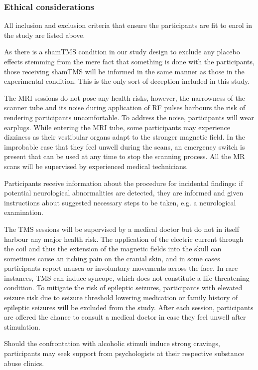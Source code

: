 \documentclass[12pt]{article}
\begin{document}
\subsubsection{Ethical considerations}
All inclusion and exclusion criteria that ensure the participants are fit to enrol in the study are listed above.

As there is a shamTMS condition in our study design to exclude any placebo effects stemming from the mere fact that something is done with the participants, those receiving shamTMS will be informed in the same manner as those in the experimental condition. This is the only sort of deception included in this study. 

The MRI sessions do not pose any health risks, however, the narrowness of the scanner tube and its noise during application of RF pulses harbours the risk of rendering participants uncomfortable. To address the noise, participants will wear earplugs. While entering the MRI tube, some participants may experience dizziness as their vestibular organs adapt to the stronger magnetic field. In the improbable case that they feel unwell during the scans, an emergency switch is present that can be used at any time to stop the scanning process. All the MR scans will be supervised by experienced medical technicians. 

Participants receive information about the procedure for incidental findings: if potential neurological abnormalities are detected, they are informed and given instructions about suggested necessary steps to be taken, e.g. a neurological examination.

The TMS sessions will be supervised by a medical doctor but do not in itself harbour any major health risk. The application of the electric current through the coil and thus the extension of the magnetic fields into the skull can sometimes cause an itching pain on the cranial skin, and in some cases participants report nausea or involuntary movements across the face. In rare instances, TMS can induce syncope, which does not constitute a life-threatening condition. To mitigate the risk of epileptic seizures, participants with elevated seizure risk due to seizure threshold lowering medication or family history of epileptic seizures will be excluded from the study. After each session, participants are offered the chance to consult a medical doctor in case they feel unwell after stimulation. 

Should the confrontation with alcoholic stimuli induce strong cravings, participants may seek support from psychologists at their respective substance abuse clinics.
\end{document}
